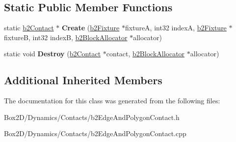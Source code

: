 \subsection*{Static Public Member Functions}
\begin{DoxyCompactItemize}
\item 
\mbox{\label{classb2_edge_and_polygon_contact_a3a0bcb2327e02bfc2079a734d8e9c8f7}} 
static \hyperlink{classb2_contact}{b2\+Contact} $\ast$ {\bfseries Create} (\hyperlink{classb2_fixture}{b2\+Fixture} $\ast$fixtureA, int32 indexA, \hyperlink{classb2_fixture}{b2\+Fixture} $\ast$fixtureB, int32 indexB, \hyperlink{classb2_block_allocator}{b2\+Block\+Allocator} $\ast$allocator)
\item 
\mbox{\label{classb2_edge_and_polygon_contact_a83260c190706928518ab1a3040c0c515}} 
static void {\bfseries Destroy} (\hyperlink{classb2_contact}{b2\+Contact} $\ast$contact, \hyperlink{classb2_block_allocator}{b2\+Block\+Allocator} $\ast$allocator)
\end{DoxyCompactItemize}
\subsection*{Additional Inherited Members}


The documentation for this class was generated from the following files\+:\begin{DoxyCompactItemize}
\item 
Box2\+D/\+Dynamics/\+Contacts/b2\+Edge\+And\+Polygon\+Contact.\+h\item 
Box2\+D/\+Dynamics/\+Contacts/b2\+Edge\+And\+Polygon\+Contact.\+cpp\end{DoxyCompactItemize}
